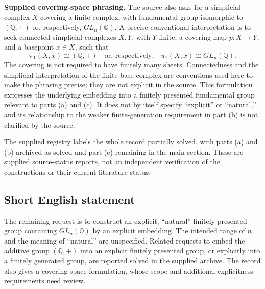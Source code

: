 \documentclass[11pt]{article}
\newcommand{\Q}{\mathbb{Q}}
\begin{document}
\textbf{Supplied covering-space phrasing.} The source also asks for a simplicial complex $X$ covering a finite complex, with fundamental group isomorphic to $(\Q,+)$ or, respectively, $GL_n(\Q)$. A precise conventional interpretation is to seek connected simplicial complexes $X,Y$, with $Y$ finite, a covering map $p:X\to Y$, and a basepoint $x\in X$, such that
\[
\pi_1(X,x)\cong(\Q,+)
\quad\text{or, respectively,}\quad
\pi_1(X,x)\cong GL_n(\Q).
\]
The covering is not required to have finitely many sheets. Connectedness and the simplicial interpretation of the finite base complex are conventions used here to make the phrasing precise; they are not explicit in the source. This formulation expresses the underlying embedding into a finitely presented fundamental group relevant to parts (a) and (c). It does not by itself specify ``explicit'' or ``natural,'' and its relationship to the weaker finite-generation requirement in part (b) is not clarified by the source.

The supplied registry labels the whole record partially solved, with parts (a) and (b) archived as solved and part (c) remaining in the main section. These are supplied source-status reports, not an independent verification of the constructions or their current literature status.
\subsection{Short English statement}
The remaining request is to construct an explicit, ``natural'' finitely presented group containing $GL_n(\Q)$ by an explicit embedding. The intended range of $n$ and the meaning of ``natural'' are unspecified. Related requests to embed the additive group $(\Q,+)$ into an explicit finitely presented group, or explicitly into a finitely generated group, are reported solved in the supplied archive. The record also gives a covering-space formulation, whose scope and additional explicitness requirements need review.
\end{document}
